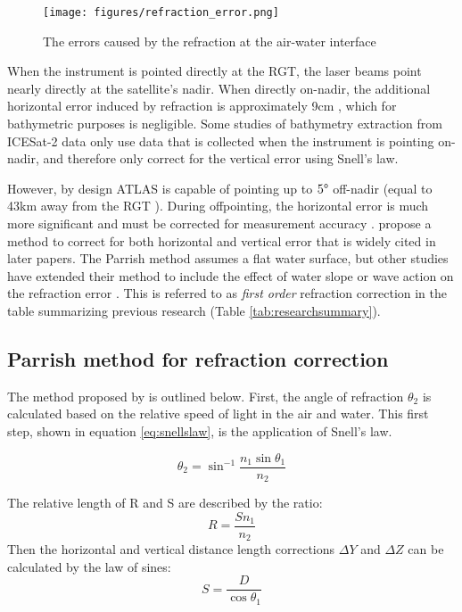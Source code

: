 \begin{figure}[ht]
      \centering
      \texttt{[image: figures/refraction\_error.png]}
      \caption{The errors caused by the refraction at the air-water interface}
      \label{refract-image}
\end{figure}

When the instrument is pointed directly at the RGT, the laser beams point nearly directly at the satellite's nadir. When directly on-nadir, the additional horizontal error induced by refraction is approximately 9cm \parencite{Parrish2019}, which for bathymetric purposes is negligible. Some studies of bathymetry extraction from ICESat-2 data only use data that is collected when the instrument is pointing on-nadir, and therefore only correct for the vertical error using Snell's law.

However, by design ATLAS is capable of pointing up to $5 \degree$ off-nadir (equal to 43km away from the RGT \parencite{Magruder2021}). During offpointing, the horizontal error is much more significant and must be corrected for measurement accuracy \parencite{Parrish2019}. \citeauthor{Parrish2019} propose a method to correct for both horizontal and vertical error that is widely cited in later papers. The Parrish method assumes a flat water surface, but other studies have extended their method to include the effect of water slope or wave action on the refraction error \parencite{Ma2020,Zhang2022}.  This is referred to as \emph{first order} refraction correction in the table summarizing previous research (Table \ref{tab:researchsummary}).

\subsection{Parrish method for refraction correction}

The method proposed by \citeauthor{Parrish2019} is outlined below. First, the angle of refraction $\theta_2$ is calculated based on the relative speed of light in the air and water. This first step, shown in equation \ref{eq:snellslaw}, is the application of Snell's law.

\begin{equation}\label{eq:snellslaw}
      \theta_2 = \sin^{-1}{\frac{n_1 \sin{\theta_1}}{n_2}}
\end{equation}

The relative length of R and S are described by the ratio:
\begin{equation}
      R = \frac{S n_1}{n_2}
\end{equation}
Then the horizontal and vertical distance length corrections $\Delta Y$ and $\Delta Z$ can be calculated by the law of sines:
\begin{equation}
      S = \frac{D}{\cos{\theta_1}}
\end{equation}

